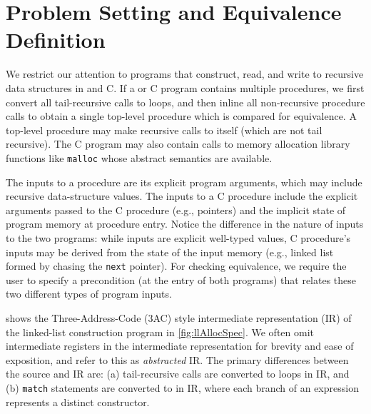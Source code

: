 \section{\large Problem Setting and Equivalence Definition}
\label{sec:problem-setting}
We restrict
our attention to programs that construct, read, and write to recursive
data structures in \SpecL{} and C.
If a \SpecL{} or C program contains multiple procedures, we first
convert all tail-recursive calls to loops, and then inline
all non-recursive procedure calls to obtain a single top-level procedure which is
compared for equivalence.
A top-level procedure
may make recursive calls to itself (which are not tail recursive).
The C program
may also contain calls to memory allocation library functions
like {\tt malloc} whose
abstract semantics are available.

The inputs to
a \SpecL{} procedure
are its explicit program arguments, which may include
recursive data-structure values.  The inputs to a
C procedure include the explicit arguments passed to the C procedure (e.g., pointers)
and the implicit state of program memory at procedure entry.
Notice the difference in the nature of inputs to the two programs: while
\SpecL{} inputs are explicit well-typed values, C procedure's
inputs may be
derived from the state of the input memory (e.g., linked list formed by chasing the
{\tt next} pointer).
For checking equivalence, we require
the user to specify a precondition (at the entry of both
programs) that relates these two different
types of program inputs.

 shows the Three-Address-Code (3AC) style
intermediate representation (IR) of the linked-list construction \SpecL{}
program in \cref{fig:llAllocSpec}.
We often omit intermediate registers in the intermediate representation
for brevity and ease of exposition, and refer to this as {\em abstracted} IR.
The primary differences between
the \SpecL{} source and IR are: (a) tail-recursive calls
are converted to loops in IR, and (b) {\tt match} statements
are converted to \sumDtor{} in IR,
where each branch of an \sumDtor{}
expression represents a distinct constructor.

